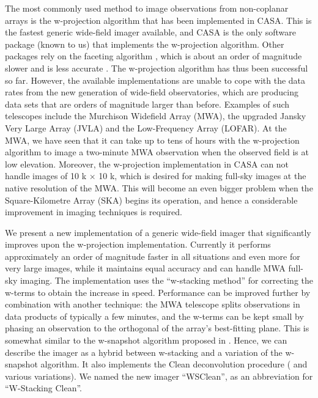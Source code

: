 \documentclass[useAMS,usenatbib]{mn2e}
\begin{document}
The most commonly used method to image observations from non-coplanar arrays is the w-projection algorithm \citep{wprojection-cornwell} that has been implemented in CASA. This is the fastest generic wide-field imager available, and CASA is the only software package (known to us) that implements the w-projection algorithm. Other packages rely on the faceting algorithm \citep{facetting-cornwell}, which is about an order of magnitude slower and is less accurate \citep{wprojection-cornwell}. The w-projection algorithm has thus been successful so far. However, the available implementations are unable to cope with the data rates from the new generation of wide-field observatories, which are producing data sets that are orders of magnitude larger than before. Examples of such telescopes include the Murchison Widefield Array (MWA), the upgraded Jansky Very Large Array (JVLA) and the Low-Frequency Array (LOFAR). At the MWA, we have seen that it can take up to tens of hours with the w-projection algorithm to image a two-minute MWA observation when the observed field is at low elevation. Moreover, the w-projection implementation in CASA can not handle images of 10 k $\times$ 10 k, which is desired for making full-sky images at the native resolution of the MWA. This will become an even bigger problem when the Square-Kilometre Array (SKA) begins its operation, and hence a considerable improvement in imaging techniques is required.

We present a new implementation of a generic wide-field imager that significantly improves upon the w-projection implementation. Currently it performs approximately an order of magnitude faster in all situations and even more for very large images, while it maintains equal accuracy and can handle MWA full-sky imaging. The implementation uses the ``w-stacking method'' for correcting the w-terms \citep{widefield-imaging-ska-cornwell} to obtain the increase in speed. Performance can be improved further by combination with another technique: the MWA telescope splits observations in data products of typically a few minutes, and the w-terms can be kept small by phasing an observation to the orthogonal of the array's best-fitting plane. This is somewhat similar to the w-snapshot algorithm proposed in \citet{widefield-imaging-ska-cornwell}. Hence, we can describe the imager as a hybrid between w-stacking and a variation of the w-snapshot algorithm. It also implements the Clean deconvolution procedure (\citealt{hogbom-clean} and various variations). We named the new imager ``WSClean'', as an abbreviation for ``W-Stacking Clean''.
\end{document}
